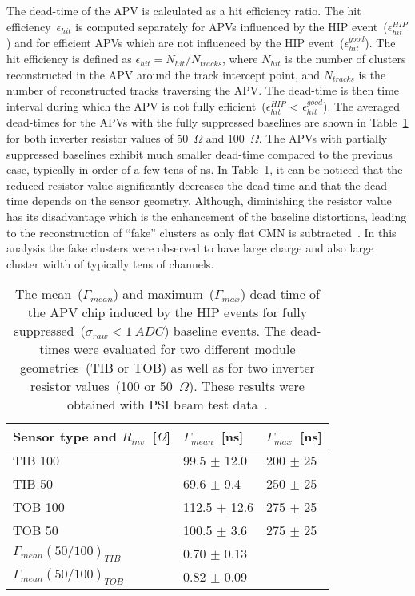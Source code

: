The dead-time of the APV is calculated as a hit efficiency ratio. The hit efficiency~$\epsilon_{hit}$ is computed separately for APVs influenced by the HIP event~($\epsilon_{hit}^{HIP}$) and for efficient APVs which are not influenced by the HIP event~($\epsilon_{hit}^{good}$). The hit efficiency is defined as $\epsilon_{hit} = N_{hit}/N_{tracks}$, where $N_{hit}$ is the number of clusters reconstructed in the APV around the track intercept point, and $N_{tracks}$ is the number of reconstructed tracks traversing the APV. The dead-time is then time interval during which the APV is not fully efficient~($\epsilon_{hit}^{HIP}$ < $\epsilon_{hit}^{good}$). The averaged dead-times for the APVs with the fully suppressed baselines are shown in Table~\ref{tab:tableDeadtimes} for both inverter resistor values of 50~$\Omega$ and 100~$\Omega$. The APVs with partially suppressed baselines exhibit much smaller dead-time compared to the previous case, typically in order of a few tens of ns. In Table~\ref{tab:tableDeadtimes}, it can be noticed that the reduced resistor value significantly decreases the dead-time and that the dead-time depends on the sensor geometry. Although, diminishing the resistor value has its disadvantage which is the enhancement of the baseline distortions, leading to the reconstruction of ``fake'' clusters as only flat CMN is subtracted~\cite{Bainbridge:2004jc}. In this analysis the fake clusters were observed to have large charge and also large cluster width of typically tens of channels. 



\begin{table}[h]
\begin{center}
\begin{tabular}{|l|l|l|}
\hline
Sensor type and $R_{inv}$~[$\Omega$] & $\Gamma_{mean}$~[ns]  & $\Gamma_{max}$~[ns] \\
\hline
\hline
TIB 100 & 99.5 $\pm$ 12.0 & 200 $\pm$ 25 \\
TIB 50 & 69.6 $\pm$ 9.4 & 250 $\pm$ 25 \\
TOB 100 & 112.5 $\pm$ 12.6 & 275 $\pm$ 25 \\
TOB 50 & 100.5 $\pm$ 3.6 & 275 $\pm$ 25 \\
\hline
$\Gamma_{mean} (50/100)_{TIB}$&  0.70 $\pm$ 0.13  & \\
$\Gamma_{mean} (50/100)_{TOB}$&  0.82 $\pm$ 0.09 & \\
\hline
\end{tabular}
\caption[Table caption text]{The mean~($\Gamma_{mean}$) and maximum~($\Gamma_{max}$) dead-time of the APV chip induced by the HIP events for fully suppressed~($\sigma_{raw}<1~ADC$) baseline events. The dead-times were evaluated for two different module geometries~(TIB or TOB) as well as for two inverter resistor values~(100 or 50~$\Omega$). These results were obtained with PSI beam test data~\cite{Bainbridge:2004jc}. }
\label{tab:tableDeadtimes}
\end{center}
\end{table}



